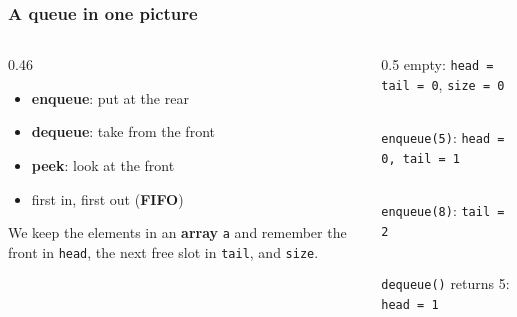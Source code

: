 \documentclass[aspectratio=169,10pt,compress]{beamer}
\begin{document}
\begin{frame}[t,fragile] \frametitle{A queue in one picture}
  \begin{columns}[T]
    \begin{column}{0.46\textwidth}
      \begin{itemize}
        \item \textbf{enqueue}: put at the rear
        \item \textbf{dequeue}: take from the front
        \item \textbf{peek}: look at the front
        \item first in, first out (\textbf{FIFO})
      \end{itemize}
      \vspace{0.4em}
      We keep the elements in an \textbf{array} \texttt{a} and remember the front in \texttt{head}, the next free slot in \texttt{tail}, and \texttt{size}.
    \end{column}
    \begin{column}{0.5\textwidth}
      \small empty: \texttt{head = tail = 0}, \texttt{size = 0}\\
      \\[0.3em]
      \texttt{enqueue(5)}: \texttt{head = 0, tail = 1}\\
      \\[0.3em]
      \texttt{enqueue(8)}: \texttt{tail = 2}\\
      \\[0.3em]
      \texttt{dequeue()} returns 5: \texttt{head = 1}\\
    \end{column}
  \end{columns}
\end{frame}

\end{document}
